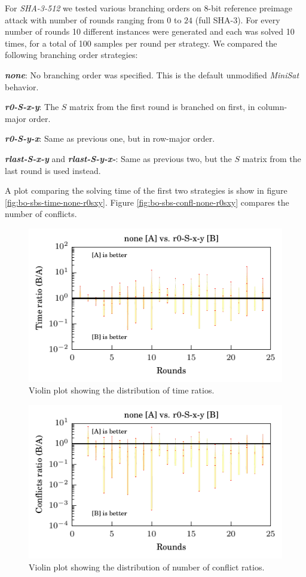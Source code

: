 For \emph{SHA-3-512} we tested various branching orders on $8$-bit reference preimage attack with number of rounds ranging from $0$ to $24$ (full SHA-3).
For every number of rounds 10 different instances were generated and each was solved 10 times, for a total of 100 samples per round per strategy.
We compared the following branching order strategies:

\textbf{\emph{none}}: No branching order was specified. This is the default unmodified \emph{MiniSat} behavior.

\textbf{\emph{r0-S-x-y}}: The $S$ matrix from the first round is branched on first, in column-major order.

\textbf{\emph{r0-S-y-x}}: Same as previous one, but in row-major order.

\textbf{\emph{rlast-S-x-y}} and \textbf{\emph{rlast-S-y-x-}}: Same as previous two, but the $S$ matrix from the last round is used instead.	

A plot comparing the solving time of the first two strategies is show in figure \ref{fig:bo-sbs-time-none-r0sxy}.
Figure \ref{fig:bo-sbs-confl-none-r0sxy} compares the number of conflicts.

\begin{figure}
\centering \includegraphics{figures/bo-ex1/ratio-time-none-r0sxy.pdf}
\caption{Violin plot showing the distribution of time ratios.}
\label{fig:bo-ratio-time-none-r0sxy}
\end{figure}

\begin{figure}
\centering \includegraphics{figures/bo-ex1/ratio-confl-none-r0sxy.pdf}
\caption{Violin plot showing the distribution of number of conflict ratios.}
\label{fig:bo-ratio-confl-none-r0sxy}
\end{figure}

